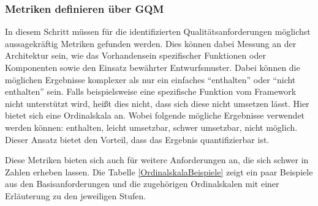 
\subsubsection{Metriken definieren über \ac*{GQM}}

In diesem Schritt müssen für die identifizierten Qualitätsanforderungen möglichst aussagekräftig Metriken gefunden werden. Dies können dabei Messung an der Architektur sein, wie das Vorhandensein spezifischer Funktionen oder Komponenten sowie den Einsatz bewährter Entwurfsmuster. Dabei können die möglichen Ergebnisse komplexer als nur ein einfaches \enquote{enthalten} oder \enquote{nicht enthalten} sein. Falls beispielsweise eine spezifische Funktion vom Framework nicht unterstützt wird, heißt dies nicht, dass sich diese nicht umsetzen lässt. Hier bietet sich eine Ordinalskala an. Wobei folgende mögliche Ergebnisse verwendet werden können: enthalten, leicht umsetzbar, schwer umsetzbar, nicht möglich. Dieser Ansatz bietet den Vorteil, dass das Ergebnis quantifizierbar ist.

Diese Metriken bieten sich auch für weitere Anforderungen an, die sich schwer in Zahlen erheben lassen. Die Tabelle \ref{OrdinalskalaBeispiele} zeigt ein paar Beispiele aus den Basisanforderungen und die zugehörigen Ordinalskalen mit einer Erläuterung zu den jeweiligen Stufen.


